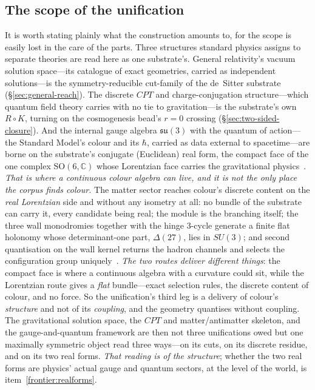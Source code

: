 \documentclass[11pt,a4paper]{article}
\theoremstyle{plain}
\theoremstyle{definition}
\theoremstyle{remark}
\begin{document}
\subsection{The scope of the unification}\label{sec:unification-scope}

It is worth stating plainly what the construction amounts to, for the scope is easily lost in the care of the parts. Three structures standard physics assigns to separate theories are read here as one substrate's. General relativity's vacuum solution space---its catalogue of exact geometries, carried as independent solutions---is the symmetry-reducible cut-family of the de~Sitter substrate (\S\ref{sec:general-reach}). The discrete $CPT$ and charge-conjugation structure---which quantum field theory carries with no tie to gravitation---is the substrate's own $R\circ K$, turning on the cosmogenesis bead's $r=0$ crossing (\S\ref{sec:two-sided-closure}). And the internal gauge algebra $\mathfrak{su}(3)$ with the quantum of action---the Standard Model's colour and its $\hbar$, carried as data external to spacetime---are borne on the substrate's conjugate (Euclidean) real form, the compact face of the one complex $\mathrm{SO}(6,\mathbb{C})$ whose Lorentzian face carries the gravitational physics~\cite{JanzenBoundary,JanzenAlgebroid}. \emph{That is where a continuous colour algebra can live, and it is not the only place the corpus finds colour.} The matter sector reaches colour's discrete content on the \emph{real Lorentzian} side and without any isometry at all: no bundle of the substrate can carry it, every candidate being real; the module is the branching itself; the three wall monodromies together with the hinge $3$-cycle generate a finite flat holonomy whose determinant-one part, $\Delta(27)$, lies in $SU(3)$; and second quantisation on the wall kernel returns the hadron channels and selects the configuration group uniquely~\cite{JanzenMatter}. \emph{The two routes deliver different things}: the compact face is where a continuous algebra with a curvature could sit, while the Lorentzian route gives a \emph{flat} bundle---exact selection rules, the discrete content of colour, and no force. So the unification's third leg is a delivery of colour's \emph{structure} and not of its \emph{coupling}, and the geometry quantises without coupling. The gravitational solution space, the $CPT$ and matter/antimatter skeleton, and the gauge-and-quantum framework are then not three unifications owed but one maximally symmetric object read three ways---on its cuts, on its discrete residue, and on its two real forms. \emph{That reading is of the structure}; whether the two real forms are physics' actual gauge and quantum sectors, at the level of the world, is item~\ref{frontier:realforms}.
\end{document}
